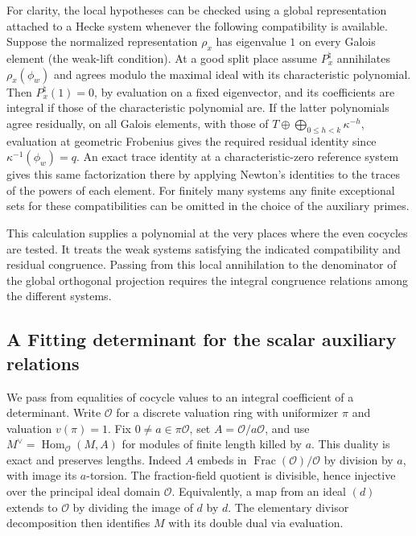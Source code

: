 \documentclass[a4paper,11pt]{article}
\theoremstyle{definition}
\theoremstyle{remark}
\numberwithin{equation}{section}
\begin{document}
For clarity, the local hypotheses can be checked using a
global representation attached to a Hecke system whenever
the following compatibility is available. Suppose the
normalized representation \(\rho_x\) has eigenvalue \(1\)
on every Galois element (the weak-lift condition). At a
good split place assume \(P_x^\natural\) annihilates
\(\rho_x(\phi_w)\) and agrees modulo the maximal ideal with
its characteristic polynomial. Then \(P_x^\natural(1)=0\),
by evaluation on a fixed eigenvector, and its coefficients
are integral if those of the characteristic polynomial are.
If the latter polynomials agree residually, on all Galois
elements, with those of
\(T\oplus\bigoplus_{0\le h<k}\kappa^{-h}\), evaluation at
geometric Frobenius gives the required residual identity
since \(\kappa^{-1}(\phi_w)=q\). An exact trace identity
at a characteristic-zero reference system gives this same
factorization there by applying Newton's identities to the
traces of the powers of each element. For finitely many
systems any finite exceptional sets for these compatibilities
can be omitted in the choice of the auxiliary primes.

This calculation supplies a polynomial at the very places
where the even cocycles are tested. It treats the weak
systems satisfying the indicated compatibility and residual
congruence. Passing from this local annihilation to the
denominator of the global orthogonal projection requires
the integral congruence relations among the different systems.
\clearpage


\subsection{A Fitting determinant for the scalar auxiliary relations}
\label{sec:scalarfitting718}

We pass from equalities of cocycle values to an integral
coefficient of a determinant. Write \(\mathcal O\) for a
discrete valuation ring with uniformizer \(\pi\) and valuation
\(v(\pi)=1\). Fix \(0\ne a\in\pi\mathcal O\), set
\(A=\mathcal O/a\mathcal O\), and use \(M^\vee=\operatorname{Hom}
_{\mathcal O}(M,A)\) for modules of finite length killed by \(a\).
This duality is exact and preserves lengths. Indeed \(A\) embeds
in \(\operatorname{Frac}(\mathcal O)/\mathcal O\) by division by
\(a\), with image its \(a\)-torsion. The fraction-field quotient
is divisible, hence injective over the principal ideal domain
\(\mathcal O\). Equivalently, a map from an ideal \((d)\) extends
to \(\mathcal O\) by dividing the image of \(d\) by \(d\).
The elementary divisor decomposition then identifies \(M\) with
its double dual via evaluation.
\end{document}
